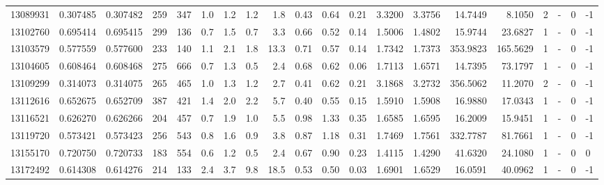 \begin{tabular}{rrrrrrrrrrrrrrrrrlrl}
  13089931 & 0.307485 &   0.307482 &  259 &  347 &      1.0 &      1.2 &     1.2 &      1.8 &       0.43 &        0.64 &        0.21 &  3.3200 &  3.3756 &   14.7449 &    8.1050 &       2 &             - &        0 &        -1 \\
  13102760 & 0.695414 &   0.695415 &  299 &  136 &      0.7 &      1.5 &     0.7 &      3.3 &       0.66 &        0.52 &        0.14 &  1.5006 &  1.4802 &   15.9744 &   23.6827 &       1 &             - &        0 &        -1 \\
  13103579 & 0.577559 &   0.577600 &  233 &  140 &      1.1 &      2.1 &     1.8 &     13.3 &       0.71 &        0.57 &        0.14 &  1.7342 &  1.7373 &  353.9823 &  165.5629 &       1 &             - &        0 &        -1 \\
  13104605 & 0.608464 &   0.608468 &  275 &  666 &      0.7 &      1.3 &     0.5 &      2.4 &       0.68 &        0.62 &        0.06 &  1.7113 &  1.6571 &   14.7395 &   73.1797 &       1 &             - &        0 &        -1 \\
  13109299 & 0.314073 &   0.314075 &  265 &  465 &      1.0 &      1.3 &     1.2 &      2.7 &       0.41 &        0.62 &        0.21 &  3.1868 &  3.2732 &  356.5062 &   11.2070 &       2 &             - &        0 &        -1 \\
  13112616 & 0.652675 &   0.652709 &  387 &  421 &      1.4 &      2.0 &     2.2 &      5.7 &       0.40 &        0.55 &        0.15 &  1.5910 &  1.5908 &   16.9880 &   17.0343 &       1 &             - &        0 &        -1 \\
  13116521 & 0.626270 &   0.626266 &  204 &  457 &      0.7 &      1.9 &     1.0 &      5.5 &       0.98 &        1.33 &        0.35 &  1.6585 &  1.6595 &   16.2009 &   15.9451 &       1 &             - &        0 &        -1 \\
  13119720 & 0.573421 &   0.573423 &  256 &  543 &      0.8 &      1.6 &     0.9 &      3.8 &       0.87 &        1.18 &        0.31 &  1.7469 &  1.7561 &  332.7787 &   81.7661 &       1 &             - &        0 &        -1 \\
  13155170 & 0.720750 &   0.720733 &  183 &  554 &      0.6 &      1.2 &     0.5 &      2.4 &       0.67 &        0.90 &        0.23 &  1.4115 &  1.4290 &   41.6320 &   24.1080 &       1 &             - &        0 &         0 \\
  13172492 & 0.614308 &   0.614276 &  214 &  133 &      2.4 &      3.7 &     9.8 &     18.5 &       0.53 &        0.50 &        0.03 &  1.6901 &  1.6529 &   16.0591 &   40.0962 &       1 &             - &        0 &        -1 \\

\end{tabular}
